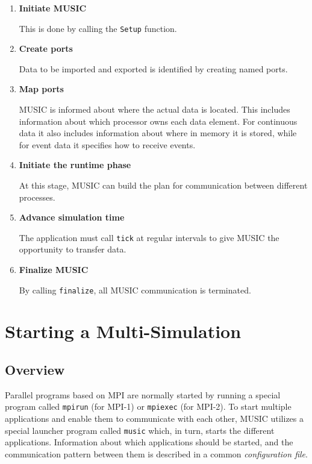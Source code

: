 \documentclass[a4paper,twoside]{report}
\begin{document}
\begin{enumerate}
\item \textbf{Initiate MUSIC}

  This is done by calling the \lstinline!Setup! function.
\item \textbf{Create ports}

  Data to be imported and exported is identified by creating named
  ports.
\item \textbf{Map ports}

  MUSIC is informed about where the actual data is located.  This
  includes information about which processor owns each data element.
  For continuous data it also includes information about where in
  memory it is stored, while for event data it specifies how to
  receive events.
\item \textbf{Initiate the runtime phase}

  At this stage, MUSIC can build the plan for communication between
  different processes.
\item \textbf{Advance simulation time}

  The application must call \lstinline!tick! at regular intervals
  to give MUSIC the opportunity to transfer data.
\item \textbf{Finalize MUSIC}

  By calling \lstinline|finalize|, all MUSIC communication is terminated.
\end{enumerate}


\chapter{Starting a Multi-Simulation}

\section{Overview}

Parallel programs based on MPI are normally started by running a
special program called \texttt{mpirun} (for MPI-1) or
\texttt{mpiexec} (for MPI-2).  To start multiple
applications and enable them to communicate with each other, MUSIC
utilizes a special launcher program called \texttt{music} which, in turn, starts the different applications.
Information about which applications should be started, and the
communication pattern between them is described in a common
\emph{configuration file}.
\end{document}
